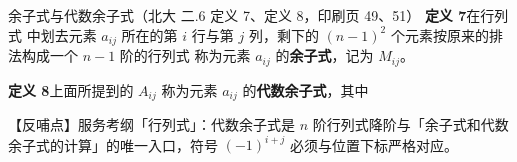 \begin{fdeep}{余子式与代数余子式（北大 二.6 定义 7、定义 8，印刷页 49、51）}
\textbf{定义 7}\quad 在行列式
中划去元素 $a_{ij}$ 所在的第 $i$ 行与第 $j$ 列，剩下的 $(n-1)^2$ 个元素按原来的排法构成一个 $n-1$ 阶的行列式
称为元素 $a_{ij}$ 的\textbf{余子式}，记为 $M_{ij}$。

\textbf{定义 8}\quad 上面所提到的 $A_{ij}$ 称为元素 $a_{ij}$ 的\textbf{代数余子式}，其中

【反哺点】服务考纲「行列式」：代数余子式是 $n$ 阶行列式降阶与「余子式和代数余子式的计算」的唯一入口，符号 $(-1)^{i+j}$ 必须与位置下标严格对应。
\end{fdeep}

